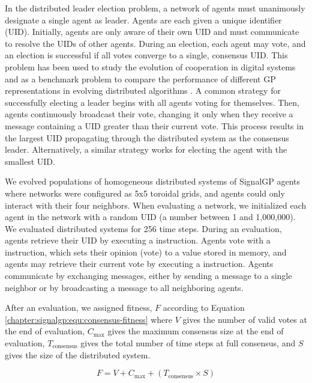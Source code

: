 In the distributed leader election problem, a network of agents must unanimously designate a single agent as leader. Agents are each given a unique identifier (UID). 
Initially, agents are only aware of their own UID and must communicate to resolve the UIDs of other agents. 
During an election, each agent may vote, and an election is successful if all votes converge to a single, consensus UID. 
This problem has been used to study the evolution of cooperation in digital systems \citep{knoester_using_2007,knoester_genetic_2013} and as a benchmark problem to compare the performance of different GP representations in evolving distributed algorithms \citep{weise_evolving_2012}. 
A common strategy for successfully electing a leader begins with all agents voting for themselves. 
Then, agents continuously broadcast their vote, changing it only when they receive a message containing a UID greater than their current vote. 
This process results in the largest UID propagating through the distributed system as the consensus leader. 
Alternatively, a similar strategy works for electing the agent with the smallest UID. 

We evolved populations of homogeneous distributed systems of SignalGP agents where networks were configured as 5x5 toroidal grids, and agents could only interact with their four neighbors. 
When evaluating a network, we initialized each agent in the network with a random UID (a number between 1 and 1,000,000). 
We evaluated distributed systems for 256 time steps. 
During an evaluation, agents retrieve their UID by executing a  instruction. 
Agents vote with a  instruction, which sets their opinion (vote) to a value stored in memory, and agents may retrieve their current vote by executing a  instruction. 
Agents communicate by exchanging messages, either by sending a message to a single neighbor or by broadcasting a message to all neighboring agents. 

After an evaluation, we assigned fitness, $F$ according to Equation \ref{chapter:signalgp:equ:consensus-fitness} where 
$V$ gives the number of valid votes at the end of evaluation, 
$C_{\text{max}}$ gives the maximum consensus size at the end of evaluation,  
$T_{\text{consensus}}$ gives the total number of time steps at full consensus, and
$S$ gives the size of the distributed system. 


\begin{equation}
    F = V + C_{\text{max}} + (T_{\text{consensus}} \times S)
    \label{chapter:signalgp:equ:consensus-fitness}
\end{equation}

